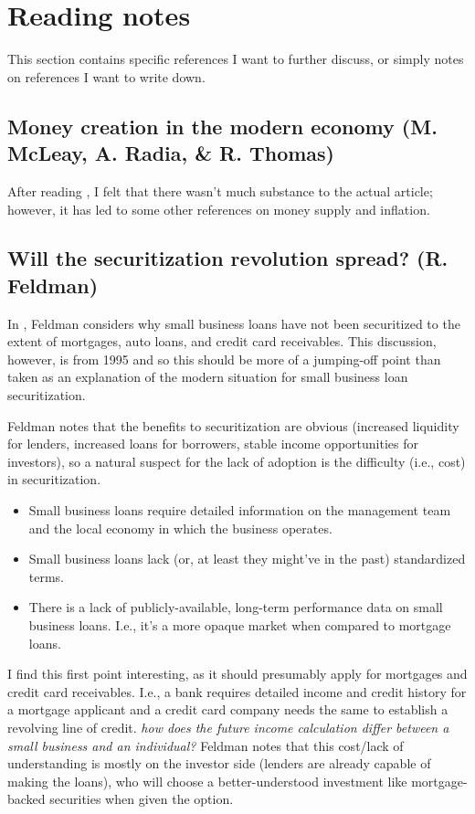 \section{Reading notes}

This section contains specific references I want to further discuss, or simply notes on references I want to write down.


\subsection{Money creation in the modern economy (M. McLeay, A. Radia, \& R. Thomas)}

After reading \cite{BOE2014}, I felt that there wasn't much substance to the actual article; however, it has led to some other references on money supply and inflation.


\subsection{Will the securitization revolution spread? (R. Feldman)}

In \cite{Feldman1995}, Feldman considers why small business loans have not been securitized to the extent of mortgages, auto loans, and credit card receivables.  This discussion, however, is from 1995 and so this should be more of a jumping-off point than taken as an explanation of the modern situation for small business loan securitization.

Feldman notes that the benefits to securitization are obvious (increased liquidity for lenders, increased loans for borrowers, stable income opportunities for investors), so a natural suspect for the lack of adoption is the difficulty (i.e., cost) in securitization.
\begin{itemize}
    \item Small business loans require detailed information on the management team and the local economy in which the business operates.
    \item Small business loans lack (or, at least they might've in the past) standardized terms.
    \item There is a lack of publicly-available, long-term performance data on small business loans.  I.e., it's a more opaque market when compared to mortgage loans.
\end{itemize}

I find this first point interesting, as it should presumably apply for mortgages and credit card receivables.  I.e., a bank requires detailed income and credit history for a mortgage applicant and a credit card company needs the same to establish a revolving line of credit.  \note{[Consider]:} {\it how does the future income calculation differ between a small business and an individual?}  Feldman notes that this cost/lack of understanding is mostly on the investor side (lenders are already capable of making the loans), who will choose a better-understood investment like mortgage-backed securities when given the option.

